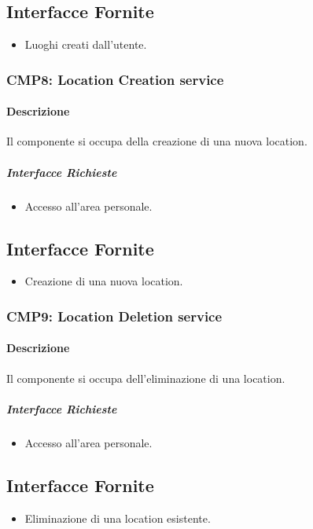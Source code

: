 \documentclass[9pt]{extarticle}
\begin{document}
\subsection{Interfacce Fornite}
\begin{itemize}
	\item Luoghi creati dall'utente.
\end{itemize}

\subsubsection*{CMP8: Location Creation service}
\paragraph{Descrizione}
Il componente si occupa della creazione di una nuova location.
\subparagraph{Interfacce Richieste}
\begin{itemize}
	\item Accesso all'area personale.
\end{itemize}
\subsection{Interfacce Fornite}
\begin{itemize}
	\item Creazione di una nuova location.
\end{itemize}

\subsubsection*{CMP9: Location Deletion service}
\paragraph{Descrizione}
Il componente si occupa dell'eliminazione di una location.
\subparagraph{Interfacce Richieste}
\begin{itemize}
	\item Accesso all'area personale.
\end{itemize}
\subsection{Interfacce Fornite}
\begin{itemize}
	\item Eliminazione di una location esistente.
\end{itemize}
\end{document}
